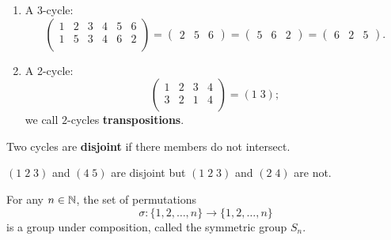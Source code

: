 \begin{example}
    \hfill
    \begin{enumerate}
        \item A 3-cycle:
            \[
                \begin{pmatrix}
                    1 & 2 & 3 & 4 & 5 & 6 \\
                    1 & 5 & 3 & 4 & 6 & 2 \\
                \end{pmatrix}
                =
                \begin{pmatrix}
                    2 & 5 & 6
                \end{pmatrix}
                = 
                \begin{pmatrix}
                    5 & 6 & 2
                \end{pmatrix}
                =
                \begin{pmatrix}
                    6 & 2 & 5
                \end{pmatrix}
                .
            \]

        \item A 2-cycle:
            \[
                \begin{pmatrix}
                    1 & 2 & 3 & 4 \\
                    3 & 2 & 1 & 4 \\
                \end{pmatrix}
                =(1\;3);
            \]
            we call $2$-cycles \textbf{transpositions}.
    \end{enumerate}
\end{example}

\begin{definition}
    Two cycles are \textbf{disjoint} if there members do not intersect.
\end{definition}

\begin{example}
    $(1\;2\;3)$ and $(4\;5)$ are disjoint but
    $(1\;2\;3)$ and $(2\;4)$ are not.
\end{example}

\begin{proposition}[]
    For any $n \in \mathbb{N}$, the set of permutations 
    \[
        \sigma: \{1,2,\ldots,n\} \to \{1,2,\ldots,n\}
    \]
    is a group under composition, called the symmetric group $S_n$.
\end{proposition}


